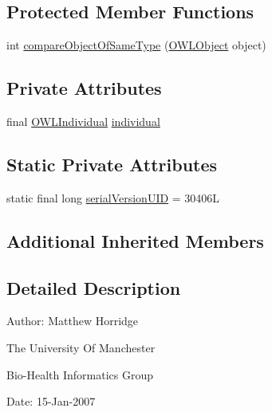 \subsection*{Protected Member Functions}
\begin{DoxyCompactItemize}
\item 
int \hyperlink{classuk_1_1ac_1_1manchester_1_1cs_1_1owl_1_1owlapi_1_1_s_w_r_l_individual_argument_impl_a5e99c2dea8090f1f242c7aec1bee1552}{compare\-Object\-Of\-Same\-Type} (\hyperlink{interfaceorg_1_1semanticweb_1_1owlapi_1_1model_1_1_o_w_l_object}{O\-W\-L\-Object} object)
\end{DoxyCompactItemize}
\subsection*{Private Attributes}
\begin{DoxyCompactItemize}
\item 
final \hyperlink{interfaceorg_1_1semanticweb_1_1owlapi_1_1model_1_1_o_w_l_individual}{O\-W\-L\-Individual} \hyperlink{classuk_1_1ac_1_1manchester_1_1cs_1_1owl_1_1owlapi_1_1_s_w_r_l_individual_argument_impl_aa1f847148e8de013c222004724cbe622}{individual}
\end{DoxyCompactItemize}
\subsection*{Static Private Attributes}
\begin{DoxyCompactItemize}
\item 
static final long \hyperlink{classuk_1_1ac_1_1manchester_1_1cs_1_1owl_1_1owlapi_1_1_s_w_r_l_individual_argument_impl_a33e2cc3aa04be13b2fcb5dfaa82da0ab}{serial\-Version\-U\-I\-D} = 30406\-L
\end{DoxyCompactItemize}
\subsection*{Additional Inherited Members}


\subsection{Detailed Description}
Author\-: Matthew Horridge\par
 The University Of Manchester\par
 Bio-\/\-Health Informatics Group\par
 Date\-: 15-\/\-Jan-\/2007\par
\par
 

